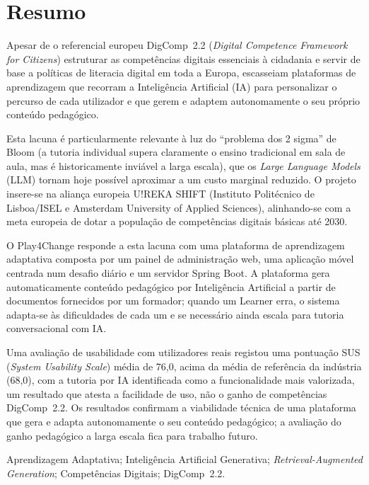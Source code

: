 \documentclass[a4paper,openright,twoside,11pt]{report}
\begin{document}
\chapter*{Resumo}
Apesar de o referencial europeu DigComp~2.2 (\textit{Digital Competence Framework for Citizens}) estruturar as competências digitais essenciais à cidadania e servir de base a políticas de literacia digital em toda a Europa, escasseiam plataformas de aprendizagem que recorram a Inteligência Artificial (IA) para personalizar o percurso de cada utilizador e que gerem e adaptem autonomamente o seu próprio conteúdo pedagógico.

Esta lacuna é particularmente relevante à luz do ``problema dos 2 sigma'' de Bloom (a tutoria individual supera claramente o ensino tradicional em sala de aula, mas é historicamente inviável a larga escala), que os \textit{Large Language Models} (LLM) tornam hoje possível aproximar a um custo marginal reduzido. O projeto insere-se na aliança europeia U!REKA SHIFT (Instituto Politécnico de Lisboa/ISEL e Amsterdam University of Applied Sciences), alinhando-se com a meta europeia de dotar a população de competências digitais básicas até 2030.

O Play4Change responde a esta lacuna com uma plataforma de aprendizagem adaptativa composta por um painel de administração web, uma aplicação móvel centrada num desafio diário e um servidor Spring Boot. A plataforma gera automaticamente conteúdo pedagógico por Inteligência Artificial a partir de documentos fornecidos por um formador; quando um Learner erra, o sistema adapta-se às dificuldades de cada um e se necessário ainda escala para tutoria conversacional com IA.

Uma avaliação de usabilidade com utilizadores reais registou uma pontuação SUS (\textit{System Usability Scale}) média de 76,0, acima da média de referência da indústria (68,0), com a tutoria por IA identificada como a funcionalidade mais valorizada, um resultado que atesta a facilidade de uso, não o ganho de competências DigComp~2.2. Os resultados confirmam a viabilidade técnica de uma plataforma que gera e adapta autonomamente o seu conteúdo pedagógico; a avaliação do ganho pedagógico a larga escala fica para trabalho futuro.

\vspace{5mm}
 Aprendizagem Adaptativa; Inteligência Artificial Generativa; \textit{Retrieval-Augmented Generation}; Competências Digitais; DigComp~2.2.

\cleardoublepage
\end{document}
